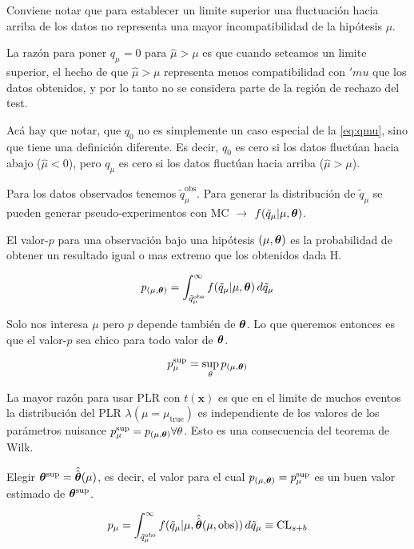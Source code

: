 Conviene notar que para establecer un limite superior una fluctuación hacia
arriba de los datos no representa una mayor incompatibilidad de la hipótesis
$\mu$.

La razón para poner $q_\mu = 0$ para $\hat{\mu} > \mu$ es que cuando seteamos un
limite superior, el hecho de que $\hat{\mu} > \mu$ representa menos
compatibilidad con $'mu$ que los datos obtenidos, y por lo tanto no se considera
parte de la región de rechazo del test.

Acá hay que notar, que $q_0$ no es simplemente un caso especial de la {\eq}
\eqref{eq:qmu}, sino que tiene una definición diferente. Es decir, $q_0$ es cero
si los datos fluctúan hacia abajo ($\hat{\mu}<0$), pero $q_\mu$ es cero si los
datos fluctúan hacia arriba ($\hat{\mu}>\mu$).

Para los datos observados tenemos $\tilde{q}_\mu^\text{obs}$. Para generar la
distribución de $\tilde{q}_\mu$ se pueden generar pseudo-experimentos con MC
$\to$ $f(\tilde{q}_\mu|\mu, \bm{\theta})$.

El valor-$p$ para una observación bajo una hipótesis $(\mu,\bm{\theta})$ es la
probabilidad de obtener un resultado igual o mas extremo que los obtenidos dada
H.

\begin{equation}
  p_{(\mu,\bm{\theta})} = \int_{\tilde{q}_\mu^\text{obs}}^{\infty}
  f(\tilde{q}_\mu|\mu,\bm{\theta}) \, d\tilde{q}_\mu
\end{equation}


Solo nos interesa $\mu$ pero $p$ depende también de $\bm{\theta}$. Lo que queremos
entonces es que el valor-$p$ sea chico para todo valor de $\bm{\theta}$.

\begin{equation}
  p_\mu^\text{sup} = \sup_\theta p_{(\mu,\bm{\theta})}
\end{equation}

La mayor razón para usar PLR con $t(\bm{x})$ es que en el limite de muchos
eventos la distribución del PLR $\lambda(\mu=\mu_\text{true})$ es independiente
de los valores de los parámetros nuisance $p_\mu^\text{sup} = p_{(\mu,\bm{\theta})}
\forall \theta$. Esto es una consecuencia del teorema de Wilk.


Elegir $\bm{\theta}^\text{sup} = \hat{\hat{\bm{\theta}}}(\mu)$, es decir, el valor para el
cual $p_{(\mu,\bm{\theta})} = p_\mu^\text{sup}$ es un buen valor estimado de
$\bm{\theta}^\text{sup}$.

\begin{equation}
  p_\mu = \int_{\tilde{q}_\mu^\text{obs}}^{\infty}
  f(\tilde{q}_\mu|\mu,\hat{\hat{\bm{\theta}}}(\mu, \text{obs})) \, d\tilde{q}_\mu \equiv
  \text{CL}_{s+b}
  \label{eq:pmu}
\end{equation}


